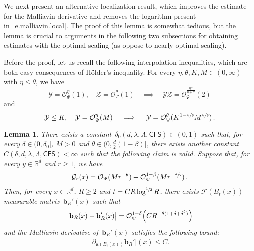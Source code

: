 \documentclass[11pt]{article} %
\numberwithin{equation}{section}
\newtheorem{lemma}[theorem]{Lemma}
\theoremstyle{definition}
\newcommand*{\R}{\ensuremath{\mathbb{R}}}
\renewcommand{\b}{\ensuremath{\mathbf{b}}}
\renewcommand{\a}{\mathbf{a}}
\newcommand{\F}{\mathcal{F}}
\renewcommand{\O}{\mathcal{O}}
\newcommand{\Y}{\ensuremath{\mathcal{Y}}}
\newcommand{\CFS}{\mathsf{CFS}}
\begin{document}
We next present an alternative localization result, which improves the estimate for the Malliavin derivative and removes the logarithm present in~\eqref{e.malliavin.local}. The proof of this lemma is somewhat tedious, but the lemma is crucial to arguments in the following two subsections
for obtaining estimates with the optimal scaling (as oppose to nearly optimal scaling).

\smallskip

Before the proof, let us recall the following interpolation inequalities, which are both easy consequences of H\"older's inequality. For every $\eta,\theta,K,M \in (0,\infty)$ with $\eta \leq \theta$, we have
\begin{equation} 
\label{e.Psi.product}
\Y = \O_{\Psi}^\eta (1), \quad \mathcal{Z}  = \O_{\Psi}^\theta (1) 
\quad \implies \quad  
\Y \mathcal{Z} = \O_{\Psi}^{ \frac{\eta \theta}{\eta + \theta} }(2)
\end{equation}
and
\begin{equation}  
\label{e.Psi.interpolation}
 \Y \leq K, \quad \Y = \O_{\Psi}^\eta (M)   
\quad \implies \quad  
\Y = \O_{\Psi}^\theta ( K^{1-\sfrac \eta\theta} M^{\sfrac \eta\theta})  
\,.
\end{equation}


\begin{lemma}
\label{l.correctorloc.new}
There exists a constant~$\delta_0(d,\lambda,\Lambda,\CFS) \in (0,1)$ such that, for every $\delta \in (0,\delta_0]$, $M>0$ and $\theta \in (0,\frac d2(1-\beta)]$, there exists another constant~$C(\delta,d,\lambda,\Lambda,\CFS)<\infty$ such that the following claim is valid.  Suppose that, for every $y \in \R^d$ and $r \geq 1$, we have
\begin{align} \label{e.local.uglyG.cond}
\mathcal{G}_r (x) 
= 
\O_{\Psi}( M r^{-\theta}) + \O_{\Psi}^{1-\beta}( M r^{-\sfrac d2} ) 
\,.
\end{align}
Then, for every $x \in \R^d$, $R \geq 2$ and $t = C R \log^{\sfrac12}R$, there exists $\F(B_{t}(x))$-measurable matrix~$\b_{R}'(x)$ such that 
\begin{align} \label{e.loc.berror}
 \big| \b_R(x) - \b_{R}'(x)  \big| 
=
\O_{\Psi}^{1-\delta } \Bigl( C R^{-\theta(1+\delta + \delta^2)} \Bigr)  
\end{align}
and the Malliavin derivative of~$\b_{R}'(x)$ satisfies the following bound:
\begin{align}  \label{e.malliavin.loc.improved}
\bigl|  \partial_{\a(B_{t}(x) )} \b_{R}'\bigr| (x)  \leq C .
\end{align}


\end{lemma}
\end{document}

